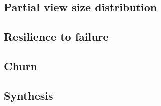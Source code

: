 \subsection{Partial view size distribution}

\subsection{Resilience to failure}

\subsection{Churn}

\subsection{Synthesis}

